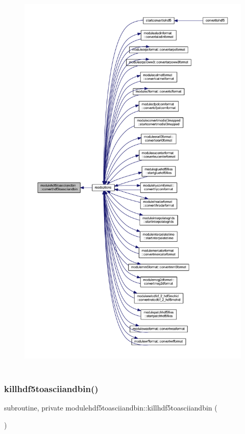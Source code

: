 \begin{figure}[H]
\begin{center}
\leavevmode
\includegraphics[height=550pt]{namespacemodulehdf5toasciiandbin_a043d466c48df398adb80b3cb771a0b47_icgraph}
\end{center}
\end{figure}
\mbox{\label{namespacemodulehdf5toasciiandbin_ae236e6042f891aa8f0a07236763a82d6}} 
\subsubsection{\texorpdfstring{killhdf5toasciiandbin()}{killhdf5toasciiandbin()}}
{\footnotesize\ttfamily subroutine, private modulehdf5toasciiandbin\+::killhdf5toasciiandbin (\begin{DoxyParamCaption}{ }\end{DoxyParamCaption})\hspace{0.3cm}{\ttfamily [private]}}

